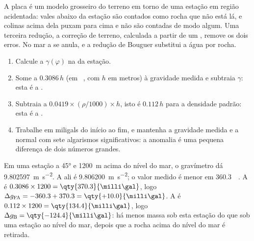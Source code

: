 A placa é um modelo grosseiro do terreno em torno de uma estação em região acidentada: vales abaixo
da estação são contados como rocha que não está lá, e colinas acima dela puxam para cima e não são contadas de modo algum.
Uma terceira redução, a correção de terreno, calculada a partir de um , remove os dois erros.
No mar a  se anula, e a redução de Bouguer substitui a água por rocha.

\begin{method}\label{met:b1:isostasy-gravity:reduction}
\begin{enumerate}
  \item Calcule a  $\gamma(\varphi)$ na  da estação.
  \item Some a  $0.3086\,h$ (em \unit{\milli\gal}, com $h$
        em metros) à gravidade medida e subtraia $\gamma$: esta é a
        .
  \item Subtraia a  $0.0419\times(\rho/1000)\times h$, isto é
        $0.112\,h$ para a densidade padrão: esta é a .
  \item Trabalhe em miligals do início ao fim, e mantenha a gravidade medida e a normal
        com sete algarismos significativos: a anomalia é uma pequena diferença de dois
        números grandes.
\end{enumerate}
\end{method}

\begin{example}\label{ex:b1:isostasy-gravity:reduction}
Em uma estação a  \ang{45} e \qty{1200}{m} acima do nível do mar, o gravímetro dá \qty{9.802597}{m.s^{-2}}. A  ali é
\qty{9.806200}{m.s^{-2}}; o valor medido é menor em \qty{360.3}{\milli\gal}.
A  é $0.3086\times1200 = \qty{370.3}{\milli\gal}$, logo
$\Delta g_{\mathrm{FA}} = -360.3 + 370.3 = \qty{+10.0}{\milli\gal}$. A  é $0.112\times1200 = \qty{134.4}{\milli\gal}$, logo $\Delta g_{\mathrm B}
= \qty{-124.4}{\milli\gal}$: há menos massa sob esta estação do que sob uma
estação ao nível do mar, depois que a rocha acima do nível do mar é retirada.
\end{example}

